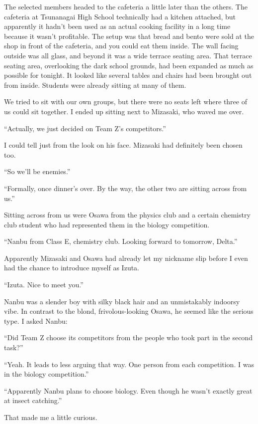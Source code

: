 \documentclass[
    a4paper,
    12pt,
    twoside,
    openany,
    UTF8,
    fontset=windows
]{ctexbook}
\begin{document}
The selected members headed to the cafeteria a little later than the others. The cafeteria at Tsunanagai High School technically had a kitchen attached, but apparently it hadn't been used as an actual cooking facility in a long time because it wasn't profitable. The setup was that bread and bento were sold at the shop in front of the cafeteria, and you could eat them inside. The wall facing outside was all glass, and beyond it was a wide terrace seating area. That terrace seating area, overlooking the dark school grounds, had been expanded as much as possible for tonight. It looked like several tables and chairs had been brought out from inside. Students were already sitting at many of them.

We tried to sit with our own groups, but there were no seats left where three of us could sit together. I ended up sitting next to Mizasaki, who waved me over.

``Actually, we just decided on Team Z's competitors.''

I could tell just from the look on his face. Mizasaki had definitely been chosen too.

``So we'll be enemies.''

``Formally, once dinner's over. By the way, the other two are sitting across from us.''

Sitting across from us were Osawa from the physics club and a certain chemistry club student who had represented them in the biology competition.

``Nanbu from Class E, chemistry club. Looking forward to tomorrow, Delta.''

Apparently Mizasaki and Osawa had already let my nickname slip before I even had the chance to introduce myself as Izuta.

``Izuta. Nice to meet you.''

Nanbu was a slender boy with silky black hair and an unmistakably indoorsy vibe. In contrast to the blond, frivolous-looking Osawa, he seemed like the serious type. I asked Nanbu:

``Did Team Z choose its competitors from the people who took part in the second task?''

``Yeah. It leads to less arguing that way. One person from each competition. I was in the biology competition.''

``Apparently Nanbu plans to choose biology. Even though he wasn't exactly great at insect catching.''

That made me a little curious.
\end{document}
